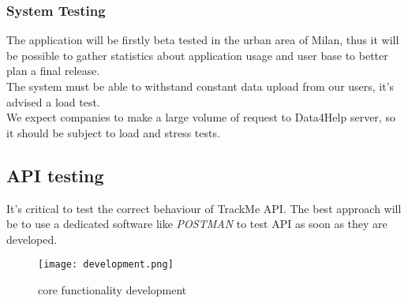 \documentclass[../main.tex]{subfiles}
\begin{document}
\subsubsection{System Testing}
    The application will be firstly beta tested in the urban area of Milan, thus it will be possible
    to gather statistics about application usage and user base to better plan a final release.\\
    The system must be able to withstand constant data upload from our users, it's advised a load test.\\
    We expect companies to make a large volume of request to Data4Help server, so it should be subject to load and stress tests.
\subsection{API testing}

    It's critical to test the correct behaviour of TrackMe API. The best approach will be to use a dedicated software like \textit{POSTMAN} to test API as soon as they are developed.
    \begin{figure}[ht]
        \centering
             \texttt{[image: development.png]}
              \caption{core functionality development}
               \label{fig:development}
    \end{figure}
 
\end{document}
